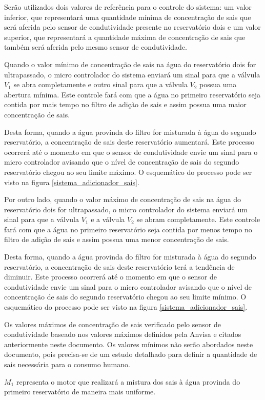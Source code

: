   Serão utilizados dois valores de referência para o controle do sistema: um valor inferior, que representará uma quantidade mínima 
  de concentração de sais que será aferida pelo sensor de condutividade presente no reservatório dois e um valor superior, que 
  representará a quantidade máxima de concentração de sais que também será aferida pelo mesmo sensor de condutividade.
  
  Quando o valor mínimo de concentração de sais na água do reservatório dois for ultrapassado, o micro controlador do sistema
  enviará um sinal para que a válvula $V_1$ se abra completamente e outro sinal para que a válvula $V_2$ possua uma abertura mínima. Este 
  controle fará com que a água no primeiro reservatório seja contida por mais tempo no filtro de adição de sais e assim possua uma
  maior concentração de sais. 
  
  Desta forma, quando a água provinda do filtro for misturada à água do segundo reservatório, a concentração de sais deste
  reservatório aumentará. Este processo ocorrerá até o momento em que o sensor de condutividade envie um sinal para o micro 
  controlador avisando que o nível de concentração de sais do segundo reservatório chegou ao seu limite máximo. O esquemático 
  do processo pode ser visto na figura \ref{sistema_adicionador_sais}.
  
  Por outro lado, quando o valor máximo de concentração de sais na água do reservatório dois for ultrapassado, o micro controlador
  do sistema enviará um sinal para que a válvula $V_1$ e a válvula $V_2$ se abram completamente. Este controle fará com que a água no primeiro
  reservatório seja contida por menos tempo no filtro de adição de sais e assim possua uma menor concentração de sais.
  
  Desta forma, quando a água provinda do filtro for misturada à água do segundo reservatório, a concentração de sais deste
  reservatório terá a tendência de diminuir. Este processo ocorrerá até o momento em que o sensor de condutividade envie um sinal
  para o micro controlador avisando que o nível de concentração de sais do segundo reservatório chegou ao seu limite mínimo. 
  O esquemático do processo pode ser visto na figura \ref{sistema_adicionador_sais}.
  
  Os valores máximos de concentração de sais verificado pelo sensor de condutividade baseado nos valores máximos definidos pela 
  Anvisa e citados anteriormente neste documento. Os valores mínimos não serão abordados neste documento, pois precisa-se de um 
  estudo detalhado para definir a quantidade de sais necessária para o consumo humano.
  
  $M_1$ representa o motor que realizará a mistura dos sais à água provinda do primeiro reservatório de maneira mais uniforme.
